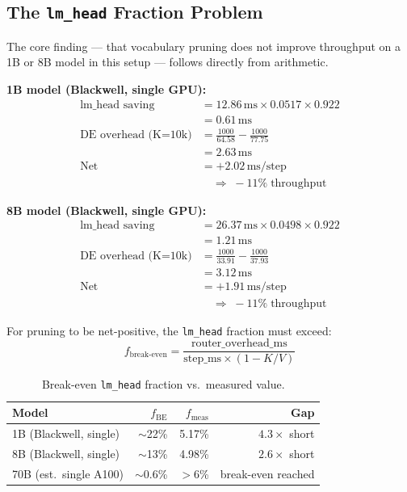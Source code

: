 \documentclass[twocolumn,10pt]{article}
\newcommand{\code}[1]{\texttt{#1}}
\newcommand{\tblhead}[1]{\textbf{#1}}
\begin{document}
\subsection{The \texttt{lm\_head} Fraction Problem}
\label{sec:lmhead-fraction}

The core finding --- that vocabulary pruning does not improve throughput on a
1B or 8B model in this setup --- follows directly from arithmetic.

\textbf{1B model (Blackwell, single GPU):}
\begin{align*}
  \text{lm\_head saving}
    &= 12.86\,\text{ms} \times 0.0517 \times 0.922 \\
    &= 0.61\,\text{ms} \\
  \text{DE overhead (K=10k)}
    &= \tfrac{1000}{64.58} - \tfrac{1000}{77.75} \\
    &= 2.63\,\text{ms} \\
  \text{Net}
    &= {+}2.02\,\text{ms/step} \\
    &\quad\Rightarrow\; {-}11\%\;\text{throughput}
\end{align*}

\textbf{8B model (Blackwell, single GPU):}
\begin{align*}
  \text{lm\_head saving}
    &= 26.37\,\text{ms} \times 0.0498 \times 0.922 \\
    &= 1.21\,\text{ms} \\
  \text{DE overhead (K=10k)}
    &= \tfrac{1000}{33.91} - \tfrac{1000}{37.93} \\
    &= 3.12\,\text{ms} \\
  \text{Net}
    &= {+}1.91\,\text{ms/step} \\
    &\quad\Rightarrow\; {-}11\%\;\text{throughput}
\end{align*}

For pruning to be net-positive, the \code{lm\_head} fraction must exceed:
\begin{equation}
  f_{\text{break-even}} =
  \frac{\text{router\_overhead\_ms}}{\text{step\_ms} \times (1 - K/V)}
\end{equation}

\begin{table}[h]
\centering
\caption{Break-even \code{lm\_head} fraction vs.\ measured value.}
\label{tab:breakeven}
\small
\begin{tabular}{@{}lrrr@{}}
\toprule
\tblhead{Model} & \tblhead{$f_\text{BE}$} & \tblhead{$f_\text{meas}$} & \tblhead{Gap} \\
\midrule
1B (Blackwell, single) & $\sim$22\% & 5.17\% & $4.3\times$ short \\
8B (Blackwell, single) & $\sim$13\% & 4.98\% & $2.6\times$ short \\
70B (est.\ single A100) & $\sim$0.6\% & $>$6\% & break-even reached \\
\bottomrule
\end{tabular}
\end{table}
\end{document}
